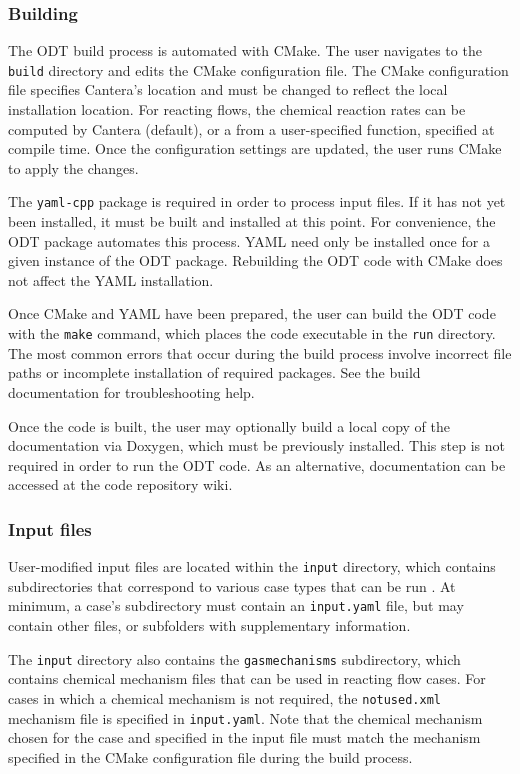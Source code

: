 \documentclass[preprint,12pt, a4paper]{elsarticle}
\begin{document}
\subsubsection{Building  }

The ODT  build process is automated with CMake. The user navigates to the \texttt{build} directory and edits the CMake configuration file. The CMake configuration file specifies Cantera's location and must be changed to reflect the local installation location. For reacting flows, the chemical reaction rates can be computed by Cantera (default), or a from a user-specified function, specified at compile time. Once the configuration settings are updated, the user runs CMake to apply the changes. 

The \texttt{yaml-cpp} package is required in order to process input files. If it has not yet been installed, it must be built and installed at this point. For convenience, the ODT  package automates this process. YAML need only be installed once for a given instance of the ODT package. Rebuilding the ODT code with CMake does not affect the YAML installation. 

Once CMake and YAML have been prepared, the user can build the ODT code with the \texttt{make} command, which places the code executable in the \texttt{run} directory. The most common errors that occur during the build process involve incorrect file paths or incomplete installation of required packages. See the build documentation for troubleshooting help. 

Once the code is built, the user may optionally build a local copy of the documentation via Doxygen, which must be previously installed. This step is not required in order to run the ODT code. As an alternative, documentation can be accessed at the code repository wiki. 

\subsubsection{Input files}

User-modified input files are located within the \texttt{input} directory, which contains subdirectories that correspond to various case types that can be run . At minimum, a case's subdirectory must contain an \texttt{input.yaml} file, but may contain other files, or subfolders with supplementary information. 

The \texttt{input} directory also contains the \texttt{gas\textunderscore mechanisms} subdirectory, which contains chemical mechanism files that can be used in reacting flow cases. For cases in which a chemical mechanism is not required, the \texttt{not\textunderscore used.xml} mechanism file is specified in \texttt{input.yaml}. Note that the chemical mechanism chosen for the case and specified in the input file must match the mechanism specified in the CMake configuration file during the  build process. 
\end{document}
